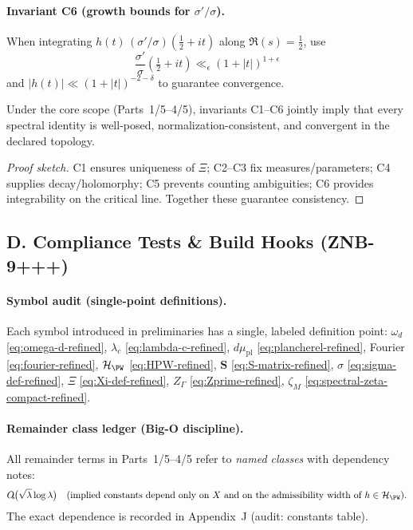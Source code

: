 \paragraph{Invariant C6 (growth bounds for $\sigma'/\sigma$).}
When integrating $h(t)\,(\sigma'/\sigma)(\tfrac12+it)$ along $\Re(s)=\tfrac12$, use
\[
  \frac{\sigma'}{\sigma}\!\left(\tfrac12+it\right) \ll_\epsilon (1+|t|)^{1+\epsilon}
\]
and $|h(t)|\ll (1+|t|)^{-2-\delta}$ to guarantee convergence.

\begin{lemma}
\label{lem:cross-check-refined}
Under the core scope (Parts~1/5–4/5), invariants C1–C6 jointly imply that every spectral identity is well-posed, normalization-consistent, and convergent in the declared topology.
\end{lemma}

\begin{proof}[Proof sketch]
C1 ensures uniqueness of $\Xi$; C2–C3 fix measures/parameters; C4 supplies decay/holomorphy; C5 prevents counting ambiguities; C6 provides integrability on the critical line. Together these guarantee consistency.
\end{proof}


\subsection*{D. Compliance Tests \& Build Hooks (ZNB-9+++)}
\label{subsec:compliance-refined}

\paragraph{Symbol audit (single-point definitions).}
Each symbol introduced in preliminaries has a single, labeled definition point:
$\omega_d$ \eqref{eq:omega-d-refined}, $\lambda_c$ \eqref{eq:lambda-c-refined},
$d\mu_{\mathrm{pl}}$ \eqref{eq:plancherel-refined}, Fourier \eqref{eq:fourier-refined},
$\mathcal H_{\PW}$ \eqref{eq:HPW-refined}, $\mathbf S$ \eqref{eq:S-matrix-refined},
$\sigma$ \eqref{eq:sigma-def-refined}, $\Xi$ \eqref{eq:Xi-def-refined},
$Z_\Gamma$ \eqref{eq:Zprime-refined}, $\zeta_M$ \eqref{eq:spectral-zeta-compact-refined}.

\paragraph{Remainder class ledger (Big-O discipline).}
All remainder terms in Parts~1/5–4/5 refer to \emph{named classes} with dependency notes:
\[
  O_{\!\!*}\!\big(\sqrt{\lambda}\log \lambda\big)
  \quad\text{(implied constants depend only on }X\text{ and on the admissibility width of }h\in\mathcal H_{\PW}\text{)}.
\]
The exact dependence is recorded in Appendix~J (audit: constants table).

